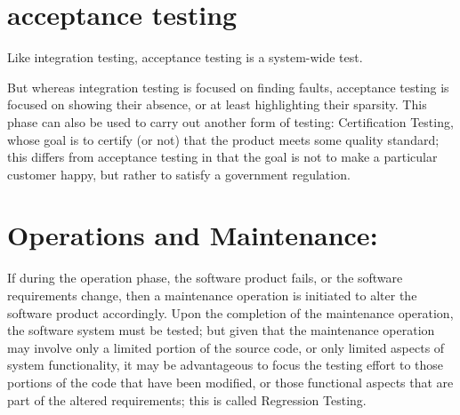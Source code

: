 \section{acceptance testing}
Like integration testing, acceptance testing is a system-wide test. 

But whereas integration testing is focused on finding faults, acceptance testing is focused on showing their absence, or at least highlighting their sparsity. This phase can also be used to carry out another form of testing: Certification Testing, whose goal is to certify (or not) that the product meets some quality standard; this differs from acceptance testing in that the goal is not to make a particular customer happy, but rather to satisfy a government regulation.

\section{Operations and Maintenance: }

If during the operation phase, the software product fails, or the software requirements change, then a maintenance operation is initiated to alter the software product accordingly. Upon the completion of the maintenance operation, the software system must be tested; but given that the maintenance operation may involve only a limited portion of the source code, or only limited aspects of system functionality, it may be advantageous to focus the testing effort to those portions of the code that have been modified, or those functional aspects that are part of the altered requirements; this is called Regression Testing.

